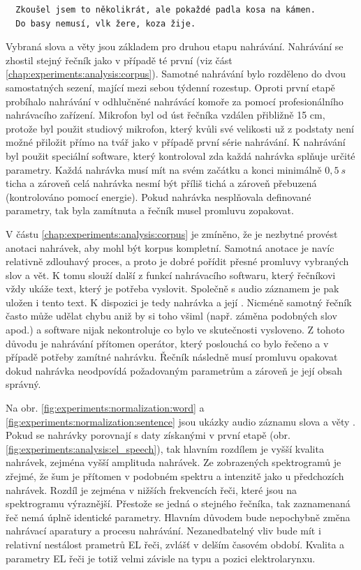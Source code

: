 \begin{verbatim}
  Zkoušel jsem to několikrát, ale pokaždé padla kosa na kámen.
  Do basy nemusí, vlk žere, koza žije.
\end{verbatim}

Vybraná slova a věty jsou základem pro druhou etapu nahrávání. Nahrávání se zhostil stejný řečník jako v případě té první (viz část \ref{chap:experiments:analysis:corpus}). Samotné nahrávání bylo rozděleno do dvou samostatných sezení, mající mezi sebou týdenní rozestup. Oproti první etapě probíhalo nahrávání v odhlučněné nahrávácí komoře za pomocí profesionálního nahrávacího zařízení. Mikrofon byl od úst řečníka vzdálen přibližně 15 cm, protože byl použit studiový mikrofon, který kvůli své velikosti už z podstaty není možné přiložit přímo na tvář jako v případě první série nahrávání. K nahrávání byl použit speciální software, který kontroloval zda každá nahrávka splňuje určité parametry. Každá nahrávka musí mít na svém začátku a konci minimálně $0,5\ s$ ticha a zároveň celá nahrávka nesmí být příliš tichá a zároveň přebuzená (kontrolováno pomocí energie). Pokud nahrávka nesplňovala definované parametry, tak byla zamítnuta a řečník musel promluvu zopakovat.

V částu \ref{chap:experiments:analysis:corpus} je zmíněno, že je nezbytné provést anotaci nahrávek, aby mohl být korpus kompletní. Samotná anotace je navíc relativně zdlouhavý proces, a proto je dobré pořídit přesné promluvy vybraných slov a vět. K tomu slouží další z funkcí nahrávacího softwaru, který řečníkovi vždy ukáže text, který je potřeba vyslovit. Společně s audio záznamem je pak uložen i tento text. K dispozici je tedy nahrávka a její . Nicméně samotný řečník často může udělat chybu aniž by si toho všiml (např. záměna podobných slov apod.) a software nijak nekontroluje co bylo ve skutečnosti vysloveno. Z tohoto důvodu je nahrávání přítomen operátor, který poslouchá co bylo řečeno a v případě potřeby zamítné nahrávku. Řečník následně musí promluvu opakovat dokud nahrávka neodpovídá požadovaným parametrům a zároveň je její obsah správný.

Na obr. \ref{fig:experiments:normalization:word} a \ref{fig:experiments:normalization:sentence} jsou ukázky audio záznamu slova  a věty . Pokud se nahrávky porovnají s daty získanými v první etapě (obr. \ref{fig:experiments:analysis:el_speech}), tak hlavním rozdílem je vyšší kvalita nahrávek, zejména vyšší amplituda nahrávek. Ze zobrazených spektrogramů je zřejmé, že šum je přítomen v podobném spektru a intenzitě jako u předchozích nahrávek. Rozdíl je zejména v nižších frekvencích řeči, které jsou na spektrogramu výraznější. Přestože se jedná o stejného řečníka, tak zaznamenaná řeč nemá úplně identické parametry. Hlavním důvodem bude nepochybně změna nahrávací aparatury a procesu nahrávání. Nezanedbatelný vliv bude mít i relativní nestálost prametrů EL řeči, zvlášť v delším časovém období. Kvalita a parametry EL řeči je totiž velmi závisle na typu a pozici elektrolarynxu.

